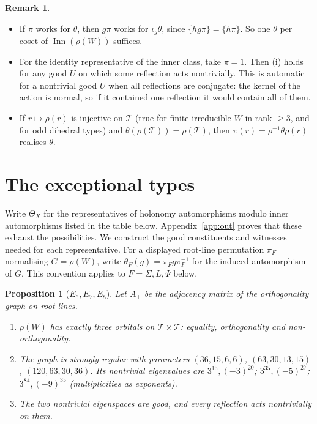 \documentclass[11pt]{article}
\newtheorem{proposition}[theorem]{Proposition}
\theoremstyle{definition}
\newtheorem{remark}[theorem]{Remark}
\newcommand{\T}{\mathcal{T}}
\newcommand{\Inn}{\operatorname{Inn}}
\begin{document}
\begin{remark}\label{rem:reduce}
\begin{itemize}
\item If $\pi$ works for $\theta$, then $g\pi$ works for $\iota_g\theta$, since $\{hg\pi\}=\{h\pi\}$. So one
$\theta$ per coset of $\Inn(\rho(W))$ suffices.
\item For the identity representative of the inner class, take $\pi=1$. Then (i) holds for any good $U$ on which some reflection acts nontrivially.
This is automatic for a nontrivial good $U$ when all reflections are conjugate: the kernel of the action is normal,
so if it contained one reflection it would contain all of them.
\item If $r\mapsto\rho(r)$ is injective on $\T$ (true for finite irreducible $W$ in rank $\ge3$, and for odd dihedral types) and
$\theta(\rho(\T))=\rho(\T)$, then $\pi(r)=\rho^{-1}\theta\rho(r)$ realises $\theta$.
\end{itemize}
\end{remark}

\section{The exceptional types}\label{sec:exceptional}

Write $\Theta_X$ for the representatives of holonomy automorphisms modulo inner automorphisms
listed in the table below. Appendix~\ref{app:out} proves that these exhaust the possibilities.
We construct the good constituents and witnesses needed for each representative.
For a displayed root-line permutation $\pi_F$ normalising $G=\rho(W)$, write
$\theta_F(g)=\pi_Fg\pi_F^{-1}$ for the induced automorphism of $G$.
This convention applies to $F=\Sigma,L,\Psi$ below.


\begin{proposition}[$E_6,E_7,E_8$]\label{prop:E}
Let $A_\perp$ be the adjacency matrix of the orthogonality graph on root lines.
\begin{enumerate}[label=(\alph*)]
\item $\rho(W)$ has exactly three orbitals on $\T\times\T$: equality, orthogonality and non-orthogonality.
\item The graph is strongly regular with parameters $(36,15,6,6)$, $(63,30,13,15)$, $(120,63,30,36)$. Its
nontrivial eigenvalues are $3^{15},(-3)^{20}$; $3^{35},(-5)^{27}$; $3^{84},(-9)^{35}$ (multiplicities as
exponents).
\item The two nontrivial eigenspaces are good, and every reflection acts nontrivially on them.
\end{enumerate}
\end{proposition}
\end{document}

